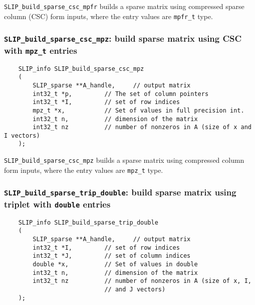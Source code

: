 \documentclass[12pt]{article}
\theoremstyle{definition}
\begin{document}
\verb|SLIP_build_sparse_csc_mpfr| builds a sparse matrix using compressed
sparse column (CSC) form inputs, where the entry values are \verb|mpfr_t| type.

\cprotect\subsubsection{\verb|SLIP_build_sparse_csc_mpz|: build sparse matrix using CSC with \verb|mpz_t| entries}
\label{s:user:build_sparse_csc_mpz}

\begin{mdframed}[userdefinedwidth=6in]
{\footnotesize
\begin{verbatim}
    SLIP_info SLIP_build_sparse_csc_mpz
    (
        SLIP_sparse **A_handle,     // output matrix
        int32_t *p,         // The set of column pointers
        int32_t *I,         // set of row indices
        mpz_t *x,           // Set of values in full precision int.
        int32_t n,          // dimension of the matrix
        int32_t nz          // number of nonzeros in A (size of x and I vectors)
    );
\end{verbatim}
} \end{mdframed}

\verb|SLIP_build_sparse_csc_mpz| builds a sparse matrix using compressed column
form inputs, where the entry values are \verb|mpz_t| type.

\cprotect\subsubsection{\verb|SLIP_build_sparse_trip_double|: build sparse matrix using triplet with \verb|double| entries}
\label{s:user:build_sparse_trip_double}

\begin{mdframed}[userdefinedwidth=6in]
{\footnotesize
\begin{verbatim}
    SLIP_info SLIP_build_sparse_trip_double
    (
        SLIP_sparse **A_handle,     // output matrix
        int32_t *I,         // set of row indices
        int32_t *J,         // set of column indices
        double *x,          // Set of values in double
        int32_t n,          // dimension of the matrix
        int32_t nz          // number of nonzeros in A (size of x, I,
                            // and J vectors)
    );
\end{verbatim}
} \end{mdframed}
\end{document}
